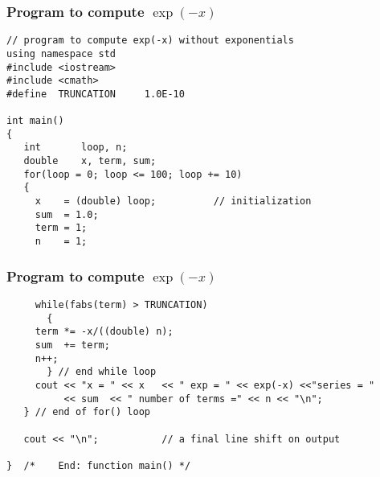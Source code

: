 \documentclass{beamer}
\newenvironment{block_mdfboxadmon}[1][]{\begin{block}{#1}}{\end{block}}
\begin{document}
\begin{frame}
\frametitle{Program to compute $\exp{(-x)}$}

\begin{block_mdfboxadmon}[]
\begin{verbatim}
// program to compute exp(-x) without exponentials
using namespace std
#include <iostream>
#include <cmath>
#define  TRUNCATION     1.0E-10

int main()
{
   int       loop, n;
   double    x, term, sum;
   for(loop = 0; loop <= 100; loop += 10)
   {
     x    = (double) loop;          // initialization
     sum  = 1.0;
     term = 1;
     n    = 1;
\end{verbatim}
\end{block_mdfboxadmon}
\end{frame}

\begin{frame}
\frametitle{Program to compute $\exp{(-x)}$}

\begin{block_mdfboxadmon}
\begin{verbatim}
     while(fabs(term) > TRUNCATION)
       {
	 term *= -x/((double) n);
	 sum  += term;
	 n++;
       } // end while loop
     cout << "x = " << x   << " exp = " << exp(-x) <<"series = "
          << sum  << " number of terms =" << n << "\n";
   } // end of for() loop

   cout << "\n";           // a final line shift on output

}  /*    End: function main() */
\end{verbatim}
\end{block_mdfboxadmon}
\end{frame}
\end{document}
